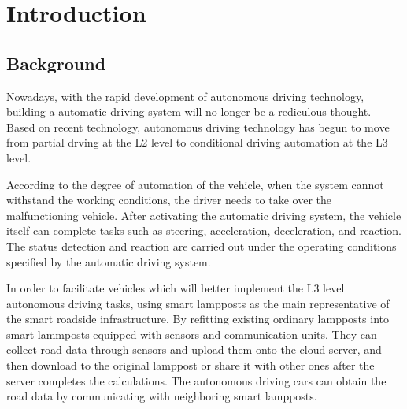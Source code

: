 \documentclass[12pt]{article}
\theoremstyle{definition}
\theoremstyle{remark}
\numberwithin{equation}{section}
\begin{document}
	
	\thispagestyle{empty}
	\maketitle
	\thispagestyle{empty}
	\newpage
	\clearpage
	\thispagestyle{empty}
	\tableofcontents %
	\newpage
	\pagestyle{fancy}
	\setcounter{page}{1}
	
	\newpage
	\section{Introduction}
		\subsection{Background}
		Nowadays, with the rapid development of autonomous driving technology, building a automatic driving system will no longer be a rediculous thought. Based on recent technology, autonomous driving technology has begun to move from partial drving at the L2 level to conditional driving automation at the L3 level.
		
		According to the degree of automation of the vehicle\cite{Autonomous Driving Levels}, when the system cannot withstand the working conditions, the driver needs to take over the malfunctioning vehicle. After activating the automatic driving system, the vehicle itself can complete tasks such as steering, acceleration, deceleration, and reaction. The status detection and reaction are carried out under the operating conditions specified by the automatic driving system.
		
		In order to facilitate vehicles which will better implement the L3 level autonomous driving tasks, using smart lampposts as the main representative of the smart roadside infrastructure. By refitting existing ordinary lampposts into smart lammposts equipped with sensors and communication units. They can collect road data through sensors and upload them onto the cloud server, and then download to the original lamppost or share it with other ones after the server completes the calculations. The autonomous driving cars can obtain the road data by communicating with neighboring smart lampposts.
\end{document}
